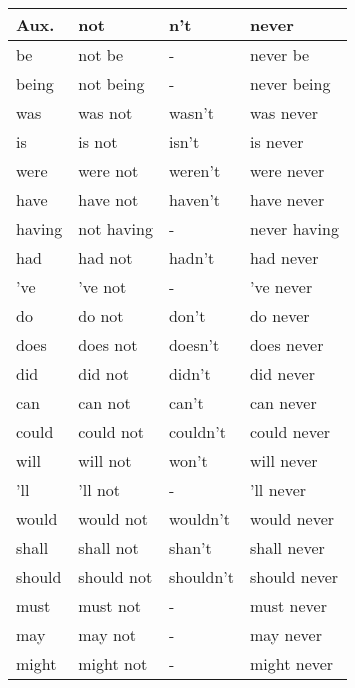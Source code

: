 \begin{tabular}{l@{\hspace{0.5in}} lll}
\toprule
\textbf{Aux.} & \textbf{not} & \textbf{n't} & \textbf{never} \\
\midrule
be & not be & - & never be \\
being & not being & - & never being \\
was & was not & wasn't & was never \\
is & is not & isn't & is never \\
were & were not & weren't & were never \\
have & have not & haven't & have never \\
having & not having & - & never having \\
had & had not & hadn't & had never \\
've & 've not & - & 've never \\
do & do not & don't & do never \\
does & does not & doesn't & does never \\
did & did not & didn't & did never \\
can & can not & can't & can never \\
could & could not & couldn't & could never \\
will & will not & won't & will never \\
'll & 'll not & - & 'll never \\
would & would not & wouldn't & would never \\
shall & shall not & shan't & shall never \\
should & should not & shouldn't & should never \\
must & must not & - & must never \\
may & may not & - & may never \\
might & might not & - & might never \\
\bottomrule    
\end{tabular}